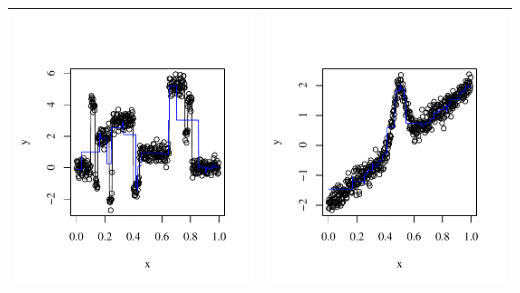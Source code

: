 \documentclass[11pt]{article}
\begin{document}
\begin{table}[h]
  \begin{center}
    \renewcommand{\arraystretch}{1.5}
    \begin{tabular}{| >{\centering\arraybackslash}m{3in} |  >{\centering\arraybackslash}m{3in} |}
      \hline
      \includegraphics[width=1\linewidth,height=0.3\textheight]{Graphs/fitted}&
      \includegraphics[width=1\linewidth,height=0.3\textheight]{Graphs/other}\\\hline

\end{tabular}
\end{center}
\end{table}
\end{document}
